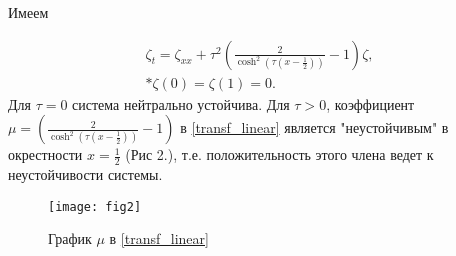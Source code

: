 Имеем 

\begin{gather} \label{transf_linear}
    \zeta_t = \zeta_{xx} + \tau^2 \left( \frac{2}{\cosh^2(\tau(x -
    \frac{1}{2}))} - 1 \right) \zeta, \\* 
    \zeta(0) = \zeta(1) = 0.
\end{gather}
Для $\tau = 0$ система нейтрально устойчива. Для $\tau > 0$, коэффициент 
$\mu = \left(\frac{2}{\cosh^2(\tau(x - \frac{1}{2}))} - 1 \right)$  в 
\eqref{transf_linear} является "неустойчивым" в окрестности 
$x = \frac{1}{2}$ (Рис 2.), т.е. положительность этого члена ведет к
неустойчивости системы.


\begin{figure}[H]
    \centering
    \texttt{[image: fig2]}
    \caption{График $\mu$ в \eqref{transf_linear}}
\end{figure}
